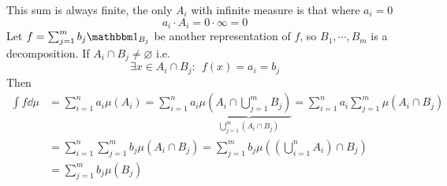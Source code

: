 \documentclass[../../script.tex]{subfiles}
\begin{document}
\begin{rem}
    This sum is always finite, the only $A_i$ with infinite measure is that where $a_i = 0$
    \[
        a_i \cdot A_i = 0 \cdot \infty = 0
    \]
    Let $f = \sum_{j=1}^m b_j \charfun_{B_j}$ be another representation of $f$, so $B_1, \cdots, B_m$ is a decomposition.
    If $A_i \cap B_j \ne \varnothing$ i.e.
    \[
        \exists x \in A_i \cap B_j: ~~f(x) = a_i = b_j
    \]
    Then 
    \begin{align*}
        \int f \dd{\mu} &= \sum_{i=1}^n a_i \mu(A_i) = \sum_{i=1}^n a_i \mu\underbrace{\left(A_i \cap \bigcup_{j=1}^m B_j \right)}_{\bigcup_{j=1}^m (A_i \cap B_j)} = \sum_{i=1}^n a_i \sum_{j=1}^m \mu(A_i \cap B_j) \\
        &= \sum_{i=1}^n \sum_{j=1}^m b_j \mu(A_i \cap B_j) = \sum_{j=1}^m b_j \mu \left(\left(\bigcup_{i=1}^n A_i \right) \cap B_j \right) \\
        &= \sum_{j=1}^m b_j \mu(B_j) 
    \end{align*}
\end{rem}
\end{document}
